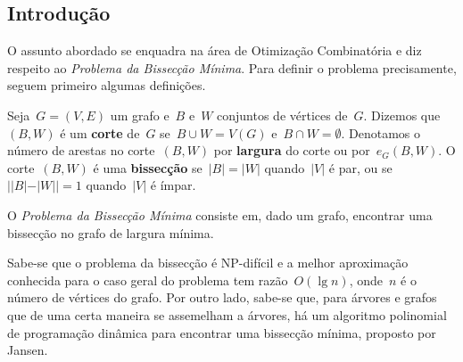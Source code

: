 \documentclass[a0,portrait]{a0poster}
\begin{document}
\begin{multicols}{3} %


\color{Navy} %


\color{Black} %
\section*{Introdução}
    O assunto abordado se
    enquadra na área de Otimização Combinatória e diz respeito ao 
    \emph{Problema da Bissecção Mínima}. Para definir o problema 
    precisamente, seguem primeiro algumas definições. 

    Seja~${G=(V,E)}$ um grafo e~$B$ e~$W$ conjuntos de vértices de~$G$.
    Dizemos que~$(B,W)$ é um \textbf{corte}
    de~$G$ se~${B \cup W =V(G)}$ e~${B\cap W =\emptyset}$.
    Denotamos o número de arestas no corte~$(B,W)$ por \textbf{largura}
    do corte ou por~$e_G(B,W)$.
    O corte~$(B,W)$ é uma \textbf{bissecção} se~${|B| =|W|}$
    quando~$|V|$ é par, ou se~${||B|-|W|| =1}$ quando~$|V|$ é ímpar.

    O \emph{Problema da Bissecção Mínima} consiste em, dado um grafo, 
    encontrar uma bissecção no grafo de largura mínima.

    Sabe-se que o problema da bissecção é NP-difícil
    e a melhor aproximação conhecida para o caso geral do problema tem 
    razão~$O(\lg n)$, onde~$n$ é o número de vértices 
    do grafo. 
    Por outro lado, sabe-se que, para árvores e grafos que de uma 
    certa maneira se assemelham a árvores, há um algoritmo polinomial 
    de programação dinâmica para encontrar uma bissecção mínima, 
    proposto por Jansen. 


\end{multicols}
\end{document}
